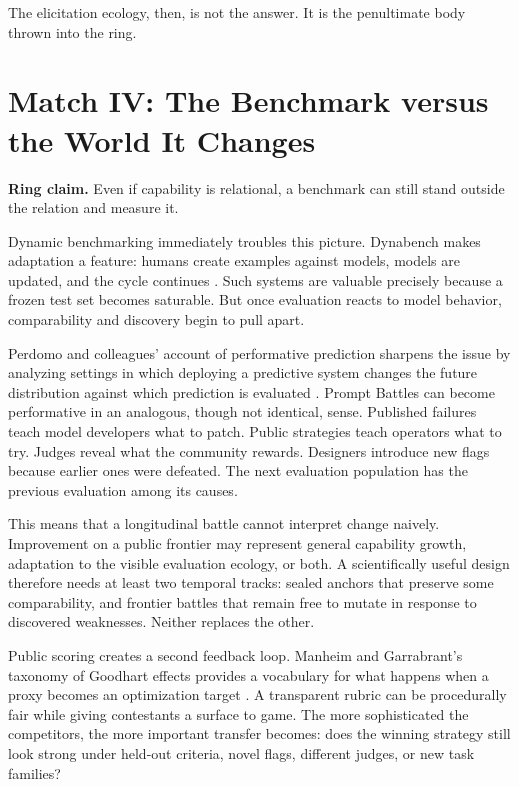 \documentclass[11pt]{article}
\newcommand{\ringclaim}[1]{\vspace{0.35em}\noindent\textbf{Ring claim.} #1\vspace{0.15em}}
\begin{document}
The elicitation ecology, then, is not the answer. It is the penultimate body thrown into the ring.

\section{Match IV: The Benchmark versus the World It Changes}
\ringclaim{Even if capability is relational, a benchmark can still stand outside the relation and measure it.}

Dynamic benchmarking immediately troubles this picture. Dynabench makes adaptation a feature: humans create examples against models, models are updated, and the cycle continues \cite{kiela2021dynabench}. Such systems are valuable precisely because a frozen test set becomes saturable. But once evaluation reacts to model behavior, comparability and discovery begin to pull apart.

Perdomo and colleagues' account of performative prediction sharpens the issue by analyzing settings in which deploying a predictive system changes the future distribution against which prediction is evaluated \cite{perdomo2020performative}. Prompt Battles can become performative in an analogous, though not identical, sense. Published failures teach model developers what to patch. Public strategies teach operators what to try. Judges reveal what the community rewards. Designers introduce new flags because earlier ones were defeated. The next evaluation population has the previous evaluation among its causes.

This means that a longitudinal battle cannot interpret change naively. Improvement on a public frontier may represent general capability growth, adaptation to the visible evaluation ecology, or both. A scientifically useful design therefore needs at least two temporal tracks: sealed anchors that preserve some comparability, and frontier battles that remain free to mutate in response to discovered weaknesses. Neither replaces the other.

Public scoring creates a second feedback loop. Manheim and Garrabrant's taxonomy of Goodhart effects provides a vocabulary for what happens when a proxy becomes an optimization target \cite{manheim2018goodhart}. A transparent rubric can be procedurally fair while giving contestants a surface to game. The more sophisticated the competitors, the more important transfer becomes: does the winning strategy still look strong under held-out criteria, novel flags, different judges, or new task families?
\end{document}
